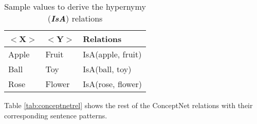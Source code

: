 \begin{table}[ht]   %
\centering
\caption{Sample values to derive the hypernymy (\textbf{\textit{IsA}}) relations} \vspace{0.25em}
\begin{tabular}{|l|l|l|} \hline
$<$X$>$ & $<$Y$>$ & Relations \\ \hline
Apple & Fruit & IsA(apple, fruit) \\ \hline
Ball & Toy & IsA(ball, toy) \\ \hline
Rose & Flower & IsA(rose, flower) \\ \hline
\end{tabular}
\label{tab:isasamples}
\end{table}

Table \ref{tab:conceptnetrel} shows the rest of the ConceptNet \cite{Speer:2012} relations with their corresponding sentence patterns. 

